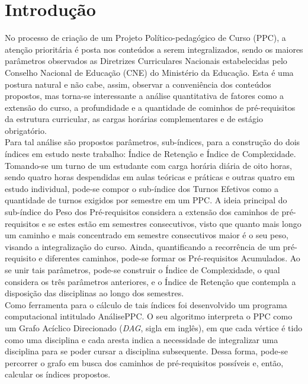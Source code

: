 \documentclass[a4paper, 12pt]{article}
\begin{document}
\section*{Introdução}

No processo de criação de um Projeto Político-pedagógico de Curso (PPC), a atenção prioritária é posta nos conteúdos a serem integralizados, sendo os maiores parâmetros 
observados as Diretrizes Curriculares Nacionais estabelecidas pelo Conselho Nacional de Educação (CNE) do Ministério da Educação. Esta é uma postura natural e 
não cabe, assim, observar a conveniência dos conteúdos propostos, mas torna-se interessante a análise quantitativa de fatores como a extensão do curso, a 
profundidade e a quantidade de cominhos de pré-requisitos da estrutura curricular, as cargas horárias complementares e de estágio obrigatório. \\

Para tal análise são propostos parâmetros, sub-índices, para a construção do dois índices em estudo neste trabalho: Índice de Retenção e Índice de Complexidade. 
Tomando-se um turno de um estudante com carga horária diária de oito horas, sendo quatro horas despendidas em aulas teóricas e práticas e outras quatro em 
estudo individual, pode-se compor o sub-índice dos Turnos Efetivos como a quantidade de turnos exigidos por semestre em um PPC. A ideia principal do 
sub-índice do Peso dos Pré-requisitos considera a extensão dos caminhos de pré-requisitos e se estes estão em semestres consecutivos, visto que quanto mais 
longo um caminho e mais concentrado em semestre consecutivos maior é o seu peso, visando a integralização do curso. Ainda, quantificando a recorrência de um 
pré-requisito e diferentes caminhos, pode-se formar os Pré-requisitos Acumulados. Ao se unir tais parâmetros, pode-se construir o Índice de Complexidade, 
o qual considera os três parâmetros anteriores, e o Índice de Retenção que contempla a disposição das disciplinas ao longo dos semestres. \\

Como ferramenta para o cálculo de tais índices foi desenvolvido um programa computacional intitulado AnálisePPC. O seu algoritmo interpreta o PPC como 
um Grafo Acíclico Direcionado (\textit{DAG}, sigla em inglês), em que cada vértice é tido como uma disciplina e cada aresta indica a necessidade de integralizar 
uma disciplina para se poder cursar a disciplina subsequente. Dessa forma, pode-se percorrer o grafo em busca dos caminhos de pré-requisitos possíveis e, então, 
calcular os índices propostos. \\
\end{document}
